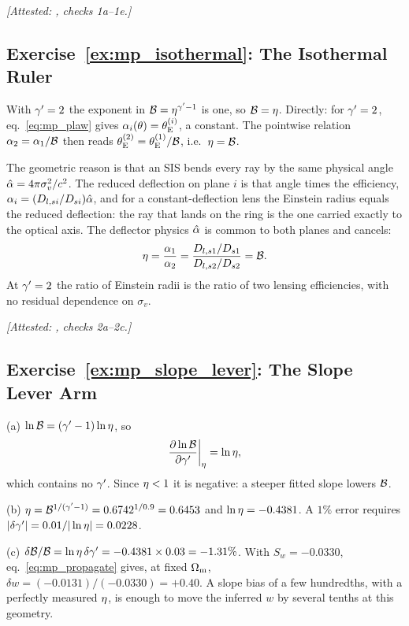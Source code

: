 \emph{[Attested: ,
checks 1a--1e.]}

\subsection*{Exercise~\ref{ex:mp_isothermal}: The Isothermal Ruler}

With $\gamma'=2$ the exponent in $\mathcal{B}=\eta^{\gamma'-1}$ is one, so
$\mathcal{B}=\eta$.  Directly: for $\gamma'=2$, eq.~\eqref{eq:mp_plaw} gives
$\alpha_i(\theta)=\theta_{\mathrm{E}}^{(i)}$, a constant.  The pointwise relation
$\alpha_2=\alpha_1/\mathcal{B}$ then reads $\theta_{\mathrm{E}}^{(2)}=\theta_{\mathrm{E}}^{(1)}/\mathcal{B}$,
i.e.\ $\eta=\mathcal{B}$.

The geometric reason is that an SIS bends every ray by the same physical angle
$\hat{\alpha}=4\pi\sigma_v^2/c^2$.  The reduced deflection on plane $i$ is
that angle times the efficiency, $\alpha_i=(D_{l,si}/D_{si})\hat{\alpha}$,
and for a constant-deflection lens the Einstein radius equals the
reduced deflection: the ray that lands on the ring is the one carried
exactly to the optical axis.  The deflector physics $\hat{\alpha}$ is common
to both planes and cancels:
\begin{equation*}
  \eta=\frac{\alpha_1}{\alpha_2}
        =\frac{D_{l,s1}/D_{s1}}{D_{l,s2}/D_{s2}}=\mathcal{B} .
\end{equation*}
At $\gamma'=2$ the ratio of Einstein radii is the ratio of two lensing
efficiencies, with no residual dependence on $\sigma_v$.

\emph{[Attested: ,
checks 2a--2c.]}

\subsection*{Exercise~\ref{ex:mp_slope_lever}: The Slope Lever Arm}

(a) $\ln\mathcal{B}=(\gamma'-1)\ln\eta$, so
\begin{equation*}
  \frac{\partial \ln\mathcal{B}}{\partial \gamma'}\bigg|_{\eta}=\ln\eta ,
\end{equation*}
which contains no $\gamma'$.  Since $\eta<1$ it is negative: a steeper
fitted slope lowers $\mathcal{B}$.

(b) $\eta=\mathcal{B}^{1/(\gamma'-1)}=0.6742^{1/0.9}=0.6453$ and
$\ln\eta=-0.4381$.  A $1\%$ error requires
$|\delta\gamma'|=0.01/|\ln\eta|=0.0228$.

(c) $\delta\mathcal{B}/\mathcal{B}=\ln\eta\,\delta\gamma'=-0.4381\times0.03
=-1.31\%$.  With $S_w=-0.0330$, eq.~\eqref{eq:mp_propagate} gives, at
fixed $\Omega_{\mathrm{m}}$, $\delta w=(-0.0131)/(-0.0330)=+0.40$.  A slope bias of a few hundredths,
with a perfectly measured $\eta$, is enough to move the inferred $w$
by several tenths at this geometry.

